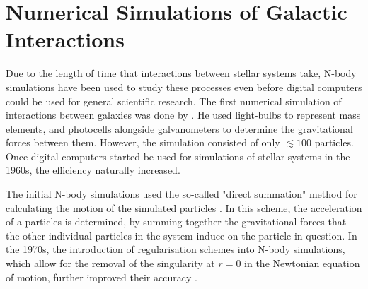 \documentclass[english, twoside]{HYgradu}
\begin{document}


\section{Numerical Simulations of Galactic Interactions}

Due to the length of time that interactions between stellar systems take, N-body simulations have been used to study these processes even before digital computers could be used for general scientific research. The first numerical  simulation of interactions between galaxies was done by \cite{Holmberg1941}. He used light-bulbs to represent mass elements, and photocells alongside galvanometers to determine the gravitational forces between them. However, the simulation consisted of only $\lesssim 100$ particles. Once digital computers started be used for simulations of stellar systems in the 1960s, the efficiency naturally increased. 

The initial N-body simulations used the so-called "direct summation" method for calculating the motion of the simulated particles \citep{vonHoerner1960, Aarseth1963}. In this scheme, the acceleration of a particles is determined, by summing together the gravitational forces that the other individual particles in the system induce on the particle in question. In the 1970s, the introduction of regularisation schemes into N-body simulations, which allow for the removal of the singularity at $r = 0$ in the Newtonian equation of motion, further improved their accuracy \citep{Aarseth1999}.
\end{document}
